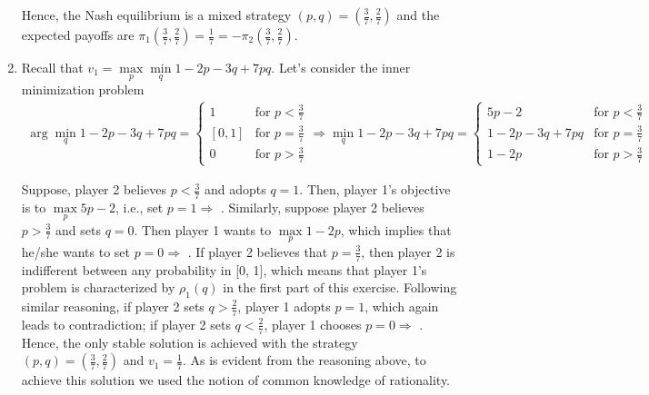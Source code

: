 \documentclass[]{article}
\begin{document}
\begin{enumerate}[label=(\roman*)]
\begin{figure}[h]
	\end{figure}
	
	Hence, the Nash equilibrium is a mixed strategy $(p, q) = (\frac{3}{7}, \frac{2}{7})$ and the expected payoffs are $\pi_1(\frac{3}{7}, \frac{2}{7}) = \frac{1}{7} = -\pi_2(\frac{3}{7}, \frac{2}{7})$.
	
	\item Recall that $v_1 = \max\limits_{p}\min\limits_{q}1 - 2p - 3q + 7pq$. Let's consider the inner minimization problem
	\begin{equation}
		\begin{split}
		\arg\min\limits_{q}1 - 2p - 3q + 7pq = \begin{cases}
		1&\text{for }p < \frac{3}{7}\\
		[0, 1]&\text{for }p = \frac{3}{7}\\
		0&\text{for }p > \frac{3}{7}
		\end{cases} \Rightarrow \min\limits_{q}1 - 2p - 3q + 7pq = \begin{cases}
		5p - 2&\text{for }p < \frac{3}{7}\\
		1 - 2p - 3q + 7pq&\text{for }p = \frac{3}{7}\\
		1 - 2p&\text{for }p > \frac{3}{7}
		\end{cases}\nonumber
		\end{split}
	\end{equation}
	
	Suppose, player 2 believes $p < \frac{3}{7}$ and adopts $q = 1$. Then, player 1's objective is to $\max\limits_{p}5p - 2$, i.e., set $p = 1\Rightarrow$ \Lightning. Similarly, suppose player 2  believes $p > \frac{3}{7}$ and sets $q = 0$. Then player 1 wants to $\max\limits_{p}1 - 2p$, which implies that he/she wants to set $p = 0\Rightarrow$ \Lightning. If player 2 believes that $p = \frac{3}{7}$, then player 2 is indifferent between any probability in [0, 1], which means that player 1's problem is characterized by $\rho_1(q)$ in the first part of this exercise. Following similar reasoning, if player 2 sets $q > \frac{2}{7}$, player 1 adopts $p = 1$, which again leads to contradiction; if player 2 sets $q < \frac{2}{7}$, player 1 chooses $p = 0 \Rightarrow$ \Lightning. Hence, the only stable solution is achieved with the strategy $(p, q) = (\frac{3}{7}, \frac{2}{7})$ and $v_1 = \frac{1}{7}$. As is evident from the reasoning above, to achieve this solution we used the notion of common knowledge of rationality.
	

\end{enumerate}
\end{document}
